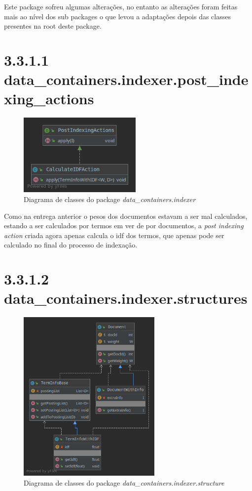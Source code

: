 \documentclass[12pt]{article}
\begin{document}
Este package sofreu algumas alterações, no entanto as alterações
foram feitas mais ao nível dos sub packages o que levou a adaptações
depois das classes presentes na root deste package.

\section*{3.3.1.1 data\_containers.indexer.post\_indexing\_actions}
\begin{figure}[h]
  \center
   \includegraphics[width=6cm]{packages_data_containers_indexer_post_indexing_actions.png}
  \caption{Diagrama de classes do package \it
    data\_containers.indexer}
\end{figure}

Como na entrega anterior o pesos dos documentos estavam a ser mal
calculados, estando a ser calculados por termos em ver de por
documentos, a {\it post indexing action} criada agora apenas calcula
o idf dos termos, que apenas pode ser calculado no final do processo
de indexação.

\section*{3.3.1.2 data\_containers.indexer.structures}
\begin{figure}[H]
  \center
   \includegraphics[width=7cm]{packages_data_containers_indexer_structures.png}
  \caption{Diagrama de classes do package \it
    data\_containers.indexer.structure}
\end{figure}
\end{document}
